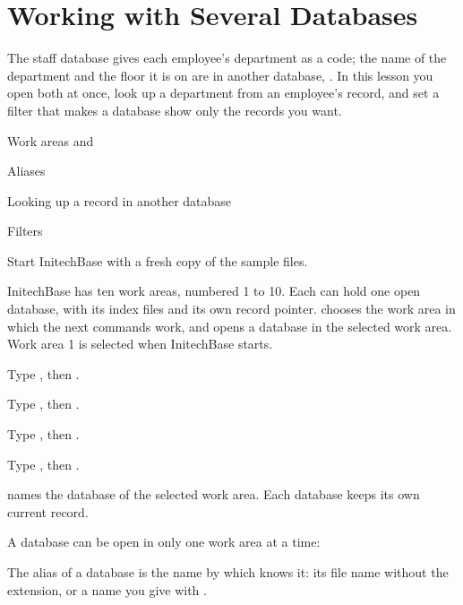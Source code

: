 \chapter{Working with Several Databases}
The staff database gives each employee's department as a code; the name of the
department and the floor it is on are in another database,
.  In this lesson you open both at once, look up a department
from an employee's record, and set a filter that makes a database show only
the records you want.

\begin{ChapterCovers}
\item Work areas and 
\item Aliases
\item Looking up a record in another database
\item Filters
\end{ChapterCovers}

Start InitechBase with a fresh copy of the sample files.

InitechBase has ten work areas, numbered 1 to 10.  Each can hold one open
database, with its index files and its own record pointer.  
chooses the work area in which the next commands work, and  opens a
database in the selected work area.  Work area 1 is selected when InitechBase
starts.
\begin{Steps}
\item Type , then .
\item Type , then .
\item Type , then .
\item Type , then .
\end{Steps}
 names the database of the selected work area.  Each database keeps
its own current record.

A database can be open in only one work area at a time:

The alias of a database is the name by which  knows it: its file
name without the extension, or a name you give with .

